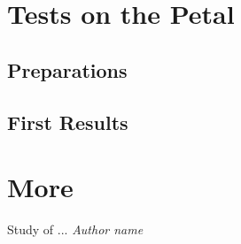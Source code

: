 \documentclass[12pt,oneside,notitlepage,abstracton,a4paper]{article}
\begin{document}
\section{Tests on the Petal}
\subsection{Preparations}
\subsection{First Results}

\section{More}


\clearpage
\begin{thebibliography}{99}
\begin{sloppypar}
 Study of ...
{\em Author name}
\end{sloppypar}
\end{thebibliography}
\end{document}
